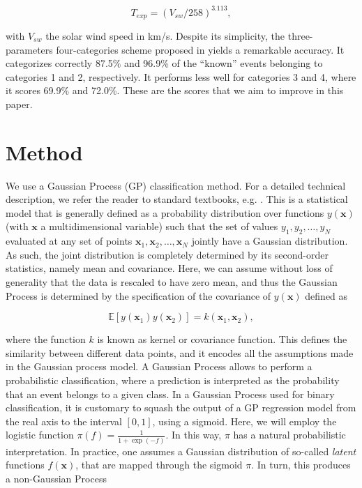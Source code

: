 \documentclass[draft,jgrga]{agutex}
\begin{document}
\begin{article}
\begin{linenomath*}
\begin{equation}
 T_{exp} = (V_{sw}/258)^{3.113},
\end{equation}
\end{linenomath*}
with $V_{sw}$ the solar wind speed in km/s.
Despite its simplicity, the three-parameters four-categories scheme proposed in \citet{xu2015} yields a remarkable accuracy. It categorizes correctly 87.5\% and 96.9\% of the ``known'' events belonging to categories 1 and 2, respectively. It performs less well for categories 3 and 4, where it scores 69.9\% and 72.0\%. These are the scores that we aim to improve in this paper.

\section{Method}\label{sec:method}
We use a Gaussian Process (GP) classification method. For a detailed technical description, we refer the reader to standard textbooks, e.g. \citep{rasmussen2006, bishop2007}. This is a statistical model that is generally defined as a probability distribution over functions $y(\mathbf{x})$ (with $\mathbf{x}$ a multidimensional variable) such that the set of values ${y_1,y_2,\dots,y_N}$ evaluated at any set of points $\mathbf{x}_1, \mathbf{x}_2,\dots,\mathbf{x}_N$ jointly have a Gaussian distribution. As such, the joint distribution is completely determined by its second-order statistics, namely mean and covariance. Here, we can assume without loss of generality that the data is rescaled to have zero mean, and thus the Gaussian Process is determined by the specification of the covariance of $y(\mathbf{x})$ defined as
\begin{linenomath*}
\begin{equation}
 \mathbb{E}[y(\mathbf{x}_1)y(\mathbf{x}_2)] = k(\mathbf{x}_1,\mathbf{x}_2),
\end{equation}
\end{linenomath*}
where the function $k$ is known as kernel or covariance function. This defines the similarity between different data points, and it encodes all the assumptions made in the Gaussian process model.
A Gaussian Process allows to perform a probabilistic classification, where a prediction is interpreted as the probability that an event belongs to a given class. 
In a Gaussian Process used for binary classification, it is customary to squash the output of a GP regression model from the real axis to the interval $[0,1]$, using a sigmoid. Here, we will employ the logistic function $\pi(f) = \frac{1}{1+\exp(-f)}$. In this way, $\pi$ has a natural probabilistic interpretation. In practice, one assumes a Gaussian distribution of so-called \emph{latent} functions $f(\mathbf{x})$, that are mapped through the sigmoid $\pi$. In turn, this produces a non-Gaussian Process

\end{article}
\end{document}
